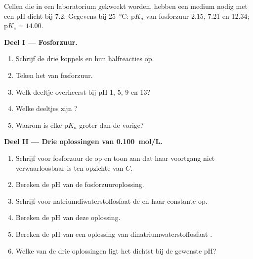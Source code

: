 \begin{problem}
\label{pb:b1:predominant-reaction:1}
Cellen die in een laboratorium gekweekt worden, hebben een medium nodig
met een pH dicht bij 7.2. Gegevens bij \qty{25}{\celsius}:
$\mathrm{p}K_a$ van fosforzuur 2.15, 7.21 en 12.34;
$\mathrm{p}K_e = 14.00$.

\medskip
\noindent\textbf{Deel I --- Fosforzuur.}
\begin{enumerate}
  \item Schrijf de drie koppels en hun halfreacties op.
  \item Teken het  van fosforzuur.
  \item Welk deeltje overheerst bij pH 1, 5, 9 en 13?
  \item Welke deeltjes zijn ?
  \item Waarom is elke $\mathrm{p}K_a$ groter dan de vorige?
\end{enumerate}

\medskip
\noindent\textbf{Deel II --- Drie oplossingen van \qty{0.100}{mol/L}.}
\begin{enumerate}[resume]
  \item Schrijf voor fosforzuur de  op en toon aan
        dat haar voortgang niet verwaarloosbaar is ten opzichte van $C$.
  \item Bereken de pH van de fosforzuuroplossing.
  \item Schrijf voor natriumdiwaterstoffosfaat  de
         en haar constante op.
  \item Bereken de pH van deze oplossing.
  \item Bereken de pH van een oplossing van dinatriumwaterstoffosfaat
        .
  \item Welke van de drie oplossingen ligt het dichtst bij de gewenste
        pH?
\end{enumerate}


\end{problem}
